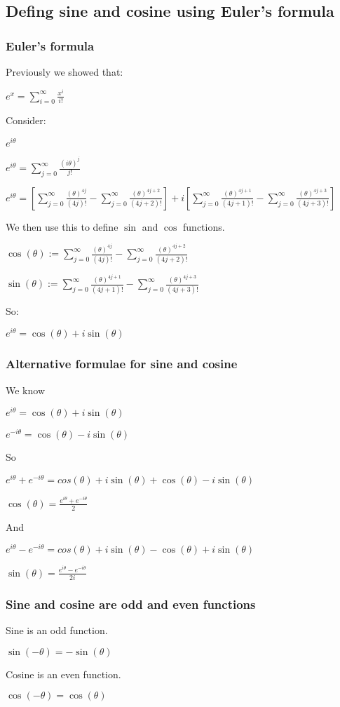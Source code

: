 
\subsection{Defing sine and cosine using Euler's formula}

\subsubsection{Euler's formula}

Previously we showed that:

\(e^x=\sum_{i=0}^\infty \frac{x^i}{i!}\)

Consider:

\(e^{i\theta }\)

\(e^{i\theta }=\sum_{j=0}^\infty \frac{(i\theta )^j}{j!}\)

\(e^{i\theta }=[\sum_{j=0}^\infty \frac{(\theta )^{4j}}{(4j)!}-\sum_{j=0}^\infty \frac{(\theta )^{4j+2}}{(4j+2)!}]+i[\sum_{j=0}^\infty \frac{(\theta )^{4j+1}}{(4j+1)!}-\sum_{j=0}^\infty \frac{(\theta )^{4j+3}}{(4j+3)!}]\)

We then use this to define \(\sin \) and \(\cos \) functions.

\(\cos (\theta ):=\sum_{j=0}^\infty \frac{(\theta )^{4j}}{(4j)!}-\sum_{j=0}^\infty \frac{(\theta )^{4j+2}}{(4j+2)!}\)

\(\sin (\theta ):=\sum_{j=0}^\infty \frac{(\theta )^{4j+1}}{(4j+1)!}-\sum_{j=0}^\infty \frac{(\theta )^{4j+3}}{(4j+3)!}\)

So:

\(e^{i\theta }=\cos (\theta )+i\sin (\theta )\)

\subsubsection{Alternative formulae for sine and cosine}

We know

\(e^{i\theta }=\cos (\theta )+i\sin (\theta )\)

\(e^{-i\theta }=\cos (\theta )-i\sin (\theta )\)

So

\(e^{i\theta }+e^{-i\theta }=cos (\theta )+i\sin (\theta )+\cos (\theta )-i\sin (\theta )\)

\(\cos (\theta )=\frac{e^{i\theta }+e^{-i\theta }}{2}\)

And

\(e^{i\theta }-e^{-i\theta }=cos (\theta )+i\sin (\theta )-\cos (\theta )+i\sin (\theta )\)

\(\sin (\theta )=\frac{e^{i\theta }-e^{-i\theta }}{2i}\)

\subsubsection{Sine and cosine are odd and even functions}

Sine is an odd function.

\(\sin (-\theta )=-\sin (\theta )\)

Cosine is an even function.

\(\cos (-\theta )=\cos (\theta )\)

